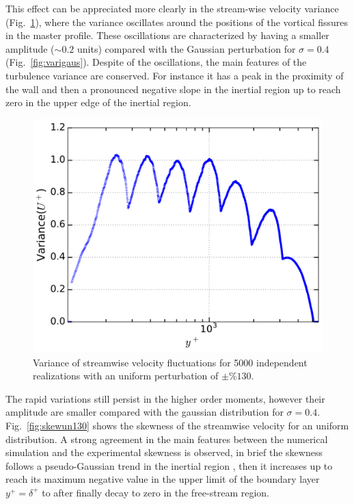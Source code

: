 \documentclass[aps,reprint,amsmath,amssymb,pra]{revtex4-1}%
\begin{document}
This effect can be appreciated more clearly in the stream-wise velocity variance (Fig.~\ref{fig:varun130}), where the variance oscillates around the positions of the vortical fissures in the master profile. These oscillations are characterized by having a smaller amplitude ($\sim 0.2$ units) compared with the Gaussian perturbation for $\sigma=0.4$ (Fig.~\ref{fig:varigaus}). Despite of the oscillations, the main features of the turbulence variance are conserved. For instance it has a peak in the proximity of the wall and then a pronounced negative slope in the inertial region up to reach zero in the upper edge of the inertial region.\\
\begin{figure}[tbh]
\includegraphics[scale=0.46]{figures/variance_5000_assembles_un130}
\caption{\label{fig:varun130} Variance of streamwise velocity fluctuations for 5000 independent realizations with an uniform perturbation of $\pm \%130$.}
\end{figure}     
The rapid variations still persist in the higher order moments, however their amplitude are smaller compared with the gaussian distribution for $\sigma=0.4$. Fig.~\ref{fig:skewun130} shows the skewness of the streamwise velocity for an uniform distribution. A strong agreement in the main features between the numerical simulation and the experimental skewness is observed, in brief the skewness follows a pseudo-Gaussian trend in the inertial region , then it increases up to reach its maximum negative value in the upper limit of the boundary layer $y^+=\delta^+$ to after finally decay to zero in the free-stream region.
\end{document}
